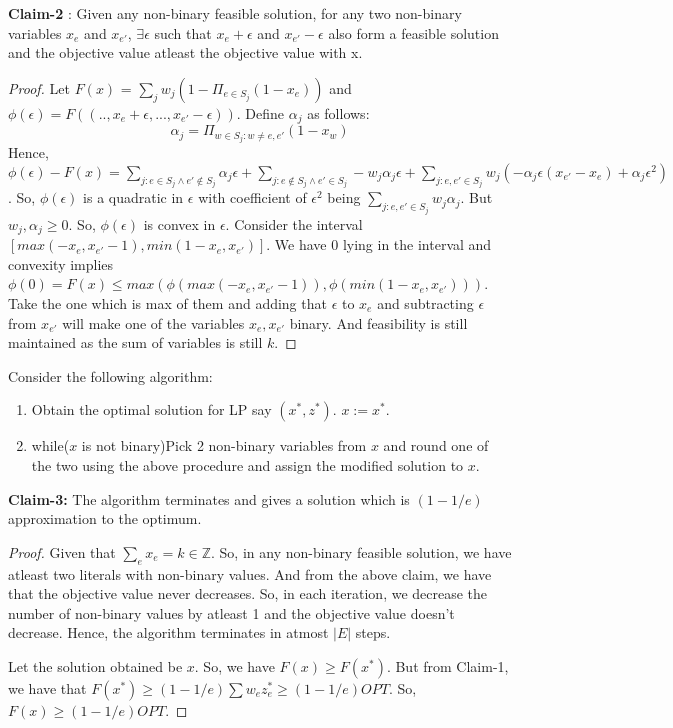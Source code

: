 \documentclass{article}
\newcommand{\size}[1]{|#1|}
\begin{document}
\noindent
\textbf{Claim-2} : Given any non-binary feasible solution, for any two non-binary variables $x_e$ and $x_{e'}$, $\exists \epsilon$ such that $x_e + \epsilon$ and $x_{e'} - \epsilon$ also form a feasible solution and the objective value atleast the objective value with x.
\begin{proof}
Let $F(x)$ = $\sum_{j}w_j(1- \Pi_{e \in S_j}(1-x_{e}))$ and $\phi(\epsilon) = F((..,x_e+\epsilon,...,x_{e'}-\epsilon))$. Define $\alpha_j$ as follows:
\begin{equation}
    \alpha_j = \Pi_{w \in S_j : w \ne e,e'}(1 - x_w)
\end{equation}
Hence, $\phi(\epsilon) - F(x) = \sum_{j : e \in S_j \land e' \notin S_j}\alpha_j\epsilon + \sum_{j : e \notin S_j \land e' \in S_j} -w_j\alpha_j\epsilon + \sum_{j : e,e' \in S_j} w_j(-\alpha_j\epsilon(x_{e'} - x_e) + \alpha_j\epsilon^2)$. So, $\phi(\epsilon)$ is a quadratic in $\epsilon$ with coefficient of $\epsilon^2$ being $\sum_{j : e,e' \in S_j}w_j\alpha_j$. But $w_j,\alpha_j \geq 0$. So, $\phi(\epsilon)$ is convex in $\epsilon$. Consider the interval $[max(-x_e, x_{e'} -1), min(1 - x_e, x_{e'})]$. We have $0$ lying in the interval and convexity implies $\phi(0) = F(x) \leq max(\phi(max(-x_e, x_{e'} -1)),\phi(min(1 - x_e, x_{e'})))$. Take the one which is max of them and adding that $\epsilon$ to $x_e$ and subtracting $\epsilon$ from $x_{e'}$ will make one of the variables $x_e, x_{e'}$ binary. And feasibility is still maintained as the sum of variables is still $k$.
\end{proof}
Consider the following algorithm:
\begin{enumerate}
    \item Obtain the optimal solution for LP say $(x^*,z^*)$. $x := x^*$.
    \item while($x$ is not binary){Pick 2 non-binary variables from $x$ and round one of the two using the above procedure and assign the modified solution to $x$}.
\end{enumerate}
\textbf{Claim-3:} The algorithm terminates and gives a solution which is $(1-1/e)$ approximation to the optimum.
\begin{proof}
Given that $\sum_{e}x_e = k \in \mathbb{Z}$. So, in any non-binary feasible solution, we have atleast two literals with non-binary values. And from the above claim, we have that the objective value never decreases.  So, in each iteration, we decrease the number of non-binary values by atleast 1 and the objective value doesn't decrease. Hence, the algorithm terminates in atmost $\size{E}$ steps.

Let the solution obtained be $x$. So, we have $F(x) \geq F(x^*)$. But from Claim-1, we have that $F(x^*) \geq (1-1/e)\sum w_ez_e^* \geq (1-1/e)OPT$. So, $F(x) \geq (1-1/e)OPT$.\end{proof}
\end{document}
